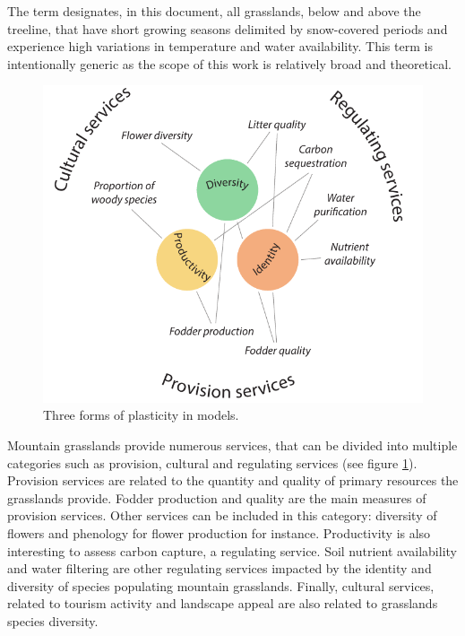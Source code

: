 The term  designates, in this document, all grasslands, below and above the treeline, that have short growing seasons delimited by snow-covered periods and experience high variations in temperature and water availability. This term is intentionally generic as the scope of this work is relatively broad and theoretical.

\begin{figure}
    \includegraphics[width=1\linewidth]{./1_Introduction/graphics/services.pdf}
  \caption[Forms of plasticity in models]{Three forms of plasticity in models. }
  \label{fig:services}
\end{figure}

Mountain grasslands provide numerous services, that can be divided into multiple categories such as provision, cultural and regulating services (see figure \ref{fig:services}). Provision services are related to the quantity and quality of primary resources the grasslands provide. Fodder production and quality are the main measures of provision services. Other services can be included in this category: diversity of flowers and phenology for flower production for instance. Productivity is also interesting to assess carbon capture, a regulating service. Soil nutrient availability and water filtering are other regulating services impacted by the identity and diversity of species populating mountain grasslands. Finally, cultural services, related to tourism activity and landscape appeal are also related to grasslands species diversity.


